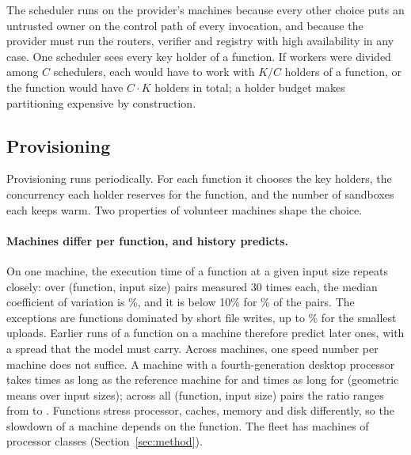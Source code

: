 The scheduler runs on the provider's machines because every other choice puts an untrusted owner on the control path
of every invocation, and because the provider must run the routers, verifier and registry with high availability in
any case. One scheduler sees every key holder of a function. If workers were divided among $C$ schedulers, each would
have to work with $K/C$ holders of a function, or the function would have $C \cdot K$ holders in total; a holder
budget makes partitioning expensive by construction.

\subsection{Provisioning}
\label{sec:prov}

Provisioning runs periodically. For each function it chooses the key holders, the concurrency each holder reserves for
the function, and the number of sandboxes each keeps warm. Two properties of volunteer machines shape the choice.

\paragraph{Machines differ per function, and history predicts.}
On one machine, the execution time of a function at a given input size repeats closely: over
\VMachCovPairs{} (function, input size) pairs measured 30 times each, the median coefficient of variation is
\VMachCovMedianPct\%, and it is below 10\% for \VMachCovUnderTenPct\% of the pairs. The exceptions are functions
dominated by short file writes, up to \VMachCovMaxPct\% for the smallest uploads. Earlier runs of a function on a machine
therefore predict later ones, with a spread that the model must carry. Across machines, one speed number per machine
does not suffice. A machine with a fourth-generation desktop processor takes \VMachRatioLo{} times as long as the
reference machine for \texttt{\VMachRatioLoFn{}} and \VMachRatioHi{} times as long for \texttt{\VMachRatioHiFn{}}
(geometric means over input sizes); across all (function, input size) pairs the ratio ranges from
\VMachRatioPairLo{} to \VMachRatioPairHi. Functions stress processor, caches, memory and disk differently, so the
slowdown of a machine depends on the function. The fleet has \VMachCount{} machines of \VMachProcClasses{} processor
classes (Section~\ref{sec:method}).

